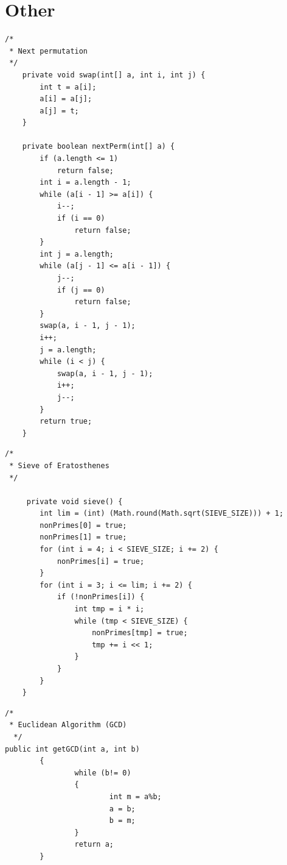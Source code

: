 \documentclass{article}
\begin{document}
    \section*{Other}
    \begin{verbatim}
/*
 * Next permutation
 */
    private void swap(int[] a, int i, int j) {
        int t = a[i];
        a[i] = a[j];
        a[j] = t;
    }

    private boolean nextPerm(int[] a) {
        if (a.length <= 1)
            return false;
        int i = a.length - 1;
        while (a[i - 1] >= a[i]) {
            i--;
            if (i == 0)
                return false;
        }
        int j = a.length;
        while (a[j - 1] <= a[i - 1]) {
            j--;
            if (j == 0)
                return false;
        }
        swap(a, i - 1, j - 1);
        i++;
        j = a.length;
        while (i < j) {
            swap(a, i - 1, j - 1);
            i++;
            j--;
        }
        return true;
    }

    \end{verbatim}
    \begin{verbatim}
/*
 * Sieve of Eratosthenes
 */
 
     private void sieve() {
        int lim = (int) (Math.round(Math.sqrt(SIEVE_SIZE))) + 1;
        nonPrimes[0] = true;
        nonPrimes[1] = true;
        for (int i = 4; i < SIEVE_SIZE; i += 2) {
            nonPrimes[i] = true;
        }
        for (int i = 3; i <= lim; i += 2) {
            if (!nonPrimes[i]) {
                int tmp = i * i;
                while (tmp < SIEVE_SIZE) {
                    nonPrimes[tmp] = true;
                    tmp += i << 1;
                }
            }
        }
    }

    \end{verbatim}
    \begin{verbatim}
/*
 * Euclidean Algorithm (GCD)
  */
public int getGCD(int a, int b)
        {
                while (b!= 0)
                {
                        int m = a%b;
                        a = b;
                        b = m;
                }
                return a;
        }
\end{verbatim}
\end{document}
